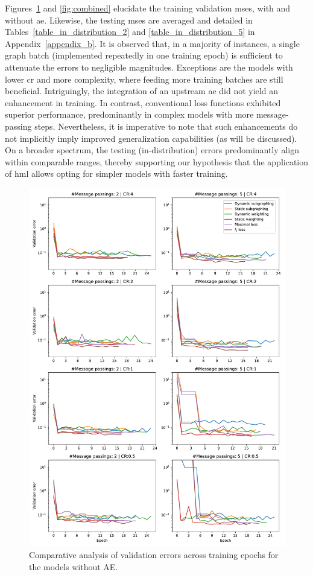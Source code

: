 Figures~\ref{fig:gnn} and \ref{fig:combined} elucidate the training validation \acp{mse}, with and without \ac{ae}. Likewise, the testing \acp{mse} are averaged and detailed in Tables~\ref{table_in_distribution_2} and \ref{table_in_distribution_5} in Appendix~\ref{appendix_b}. It is observed that, in a majority of instances, a single graph batch (implemented repeatedly in one training epoch) is sufficient to attenuate the errors to negligible magnitudes. Exceptions are the models with lower \ac{cr} and more complexity, where feeding more training batches are still beneficial. Intriguingly, the integration of an upstream \ac{ae} did not yield an enhancement in training. In contrast, conventional loss functions exhibited superior performance, predominantly in complex models with more message-passing steps. Nevertheless, it is imperative to note that such enhancements do not implicitly imply improved generalization capabilities (as will be discussed). On a broader spectrum, the testing (in-distribution) errors predominantly align within comparable ranges, thereby supporting our hypothesis that the application of \ac{hml} allows opting for simpler models with faster training.
%
\begin{figure}\centering
\includegraphics[width=1\linewidth,keepaspectratio]{gnn.pdf}
\caption{Comparative analysis of validation errors across training epochs for the models without AE.}\label{fig:gnn}
\end{figure}
